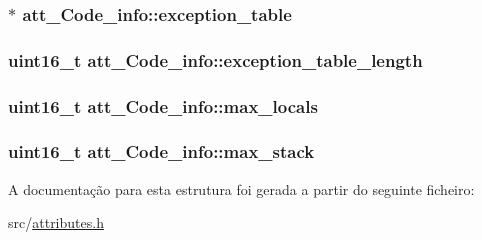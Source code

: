 \subsubsection[{\texorpdfstring{exception\+\_\+table}{exception_table}}]{$\ast$ att\+\_\+\+Code\+\_\+info\+::exception\+\_\+table}\hypertarget{structatt__Code__info_af5c5d84bb1f725dc949981cc752c45d2}{}\label{structatt__Code__info_af5c5d84bb1f725dc949981cc752c45d2}
\subsubsection[{\texorpdfstring{exception\+\_\+table\+\_\+length}{exception_table_length}}]{\setlength{\rightskip}{0pt plus 5cm}uint16\+\_\+t att\+\_\+\+Code\+\_\+info\+::exception\+\_\+table\+\_\+length}\hypertarget{structatt__Code__info_aacd07775342d4f5ace7485e36e2e5e3b}{}\label{structatt__Code__info_aacd07775342d4f5ace7485e36e2e5e3b}
\subsubsection[{\texorpdfstring{max\+\_\+locals}{max_locals}}]{\setlength{\rightskip}{0pt plus 5cm}uint16\+\_\+t att\+\_\+\+Code\+\_\+info\+::max\+\_\+locals}\hypertarget{structatt__Code__info_acc9a5f7316ef5c5e051f88646bacf445}{}\label{structatt__Code__info_acc9a5f7316ef5c5e051f88646bacf445}
\subsubsection[{\texorpdfstring{max\+\_\+stack}{max_stack}}]{\setlength{\rightskip}{0pt plus 5cm}uint16\+\_\+t att\+\_\+\+Code\+\_\+info\+::max\+\_\+stack}\hypertarget{structatt__Code__info_aa2d5de07b8832d1cd18a3e4779348fe3}{}\label{structatt__Code__info_aa2d5de07b8832d1cd18a3e4779348fe3}


A documentação para esta estrutura foi gerada a partir do seguinte ficheiro\+:\begin{DoxyCompactItemize}
\item 
src/\hyperlink{attributes_8h}{attributes.\+h}\end{DoxyCompactItemize}
